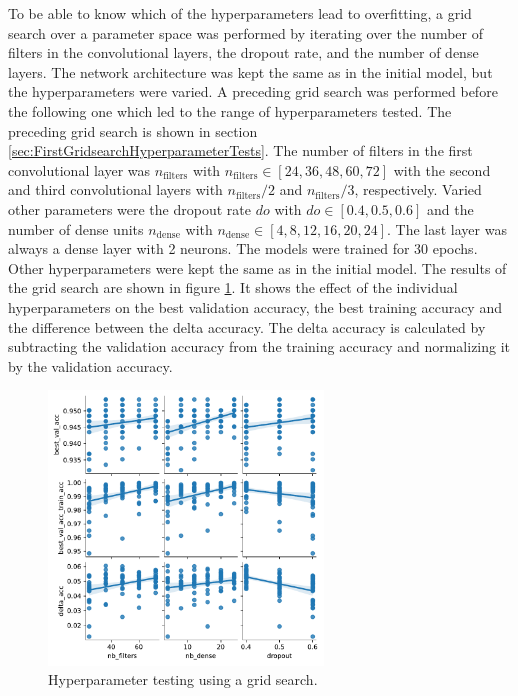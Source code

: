 To be able to know which of the hyperparameters lead to overfitting, a grid search over a parameter space was performed by iterating over the number of filters in the convolutional layers, the dropout rate, and the number of dense layers.
The network architecture was kept the same as in the initial model, but the hyperparameters were varied.
A preceding grid search was performed before the following one which led to the range of hyperparameters tested.
The preceding grid search is shown in section \ref{sec:FirstGridsearchHyperparameterTests}.
The number of filters in the first convolutional layer was $n_{\text{filters}}$ with $n_{\text{filters}} \in [24, 36, 48, 60, 72]$ with the second and third convolutional layers with $n_{\text{filters}}/2$ and $n_{\text{filters}}/3$, respectively.
Varied other parameters were the dropout rate $do$ with $do \in [0.4, 0.5, 0.6]$ and the number of dense units $n_{\text{dense}}$ with $n_{\text{dense}} \in [4, 8, 12, 16, 20, 24]$.
The last layer was always a dense layer with 2 neurons.
The models were trained for 30 epochs.
Other hyperparameters were kept the same as in the initial model.
The results of the grid search are shown in figure \ref{fig:gridsearch}.
It shows the effect of the individual hyperparameters on the best validation accuracy, the best training accuracy and the difference between the delta accuracy.
The delta accuracy is calculated by subtracting the validation accuracy from the training accuracy and normalizing it by the validation accuracy.
\begin{figure}[H]
    \centering
    \includegraphics[width=0.65\textwidth]{plots/pairplot.pdf}
    \caption{Hyperparameter testing using a grid search.}
    \label{fig:gridsearch}
\end{figure}


